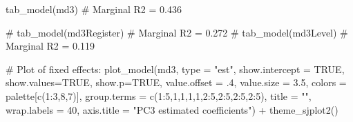 \documentclass[
  letterpaper,
  DIV=11,
  numbers=noendperiod]{scrreprt}
\newenvironment{Shaded}{\begin{snugshade}}{\end{snugshade}}
\newcommand{\AttributeTok}[1]{\textcolor[rgb]{0.40,0.45,0.13}{#1}}
\newcommand{\CommentTok}[1]{\textcolor[rgb]{0.37,0.37,0.37}{#1}}
\newcommand{\ConstantTok}[1]{\textcolor[rgb]{0.56,0.35,0.01}{#1}}
\newcommand{\DecValTok}[1]{\textcolor[rgb]{0.68,0.00,0.00}{#1}}
\newcommand{\FloatTok}[1]{\textcolor[rgb]{0.68,0.00,0.00}{#1}}
\newcommand{\FunctionTok}[1]{\textcolor[rgb]{0.28,0.35,0.67}{#1}}
\newcommand{\NormalTok}[1]{\textcolor[rgb]{0.00,0.23,0.31}{#1}}
\newcommand{\SpecialCharTok}[1]{\textcolor[rgb]{0.37,0.37,0.37}{#1}}
\newcommand{\StringTok}[1]{\textcolor[rgb]{0.13,0.47,0.30}{#1}}
\begin{document}
\begin{Shaded}
\begin{Highlighting}[]
\FunctionTok{tab\_model}\NormalTok{(md3) }\CommentTok{\# Marginal R2 = 0.436}
\end{Highlighting}
\end{Shaded}

\begin{Shaded}
\begin{Highlighting}[]
\CommentTok{\# tab\_model(md3Register) \# Marginal R2 = 0.272}
\CommentTok{\# tab\_model(md3Level) \# Marginal R2 = 0.119}

\CommentTok{\# Plot of fixed effects:}
\FunctionTok{plot\_model}\NormalTok{(md3, }
           \AttributeTok{type =} \StringTok{"est"}\NormalTok{,}
           \AttributeTok{show.intercept =} \ConstantTok{TRUE}\NormalTok{,}
           \AttributeTok{show.values=}\ConstantTok{TRUE}\NormalTok{, }
           \AttributeTok{show.p=}\ConstantTok{TRUE}\NormalTok{,}
           \AttributeTok{value.offset =}\NormalTok{ .}\DecValTok{4}\NormalTok{,}
           \AttributeTok{value.size =} \FloatTok{3.5}\NormalTok{,}
           \AttributeTok{colors =}\NormalTok{ palette[}\FunctionTok{c}\NormalTok{(}\DecValTok{1}\SpecialCharTok{:}\DecValTok{3}\NormalTok{,}\DecValTok{8}\NormalTok{,}\DecValTok{7}\NormalTok{)],}
           \AttributeTok{group.terms =} \FunctionTok{c}\NormalTok{(}\DecValTok{1}\SpecialCharTok{:}\DecValTok{5}\NormalTok{,}\DecValTok{1}\NormalTok{,}\DecValTok{1}\NormalTok{,}\DecValTok{1}\NormalTok{,}\DecValTok{1}\NormalTok{,}\DecValTok{2}\SpecialCharTok{:}\DecValTok{5}\NormalTok{,}\DecValTok{2}\SpecialCharTok{:}\DecValTok{5}\NormalTok{,}\DecValTok{2}\SpecialCharTok{:}\DecValTok{5}\NormalTok{,}\DecValTok{2}\SpecialCharTok{:}\DecValTok{5}\NormalTok{), }
           \AttributeTok{title =} \StringTok{""}\NormalTok{,}
           \AttributeTok{wrap.labels =} \DecValTok{40}\NormalTok{,}
           \AttributeTok{axis.title =} \StringTok{"PC3 estimated coefficients"}\NormalTok{) }\SpecialCharTok{+}
  \FunctionTok{theme\_sjplot2}\NormalTok{() }
\end{Highlighting}
\end{Shaded}
\end{document}

